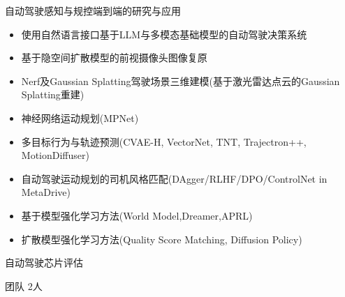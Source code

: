 \documentclass[../cv_cn.tex]{subfiles}
\begin{document}
\begin{cventries}
{\begin{cvitems}
			\item 自动驾驶感知与规控端到端的研究与应用
			\begin{itemize}
				\item 使用自然语言接口基于LLM与多模态基础模型的自动驾驶决策系统 \supercite{Xin_LLM_24} \supercite{Xin_VLM_24}
				\item 基于隐空间扩散模型的前视摄像头图像复原\supercite{Xin_Latent_Diffusion_23}
				\item Nerf及Gaussian Splatting驾驶场景三维建模(基于激光雷达点云的Gaussian Splatting重建)
				\item 神经网络运动规划(MPNet)
				\item 多目标行为与轨迹预测(CVAE-H, VectorNet, TNT, Trajectron++, MotionDiffuser)
				\item 自动驾驶运动规划的司机风格匹配(DAgger/RLHF/DPO/ControlNet in MetaDrive)
				\item 基于模型强化学习方法(World Model,Dreamer,APRL)
				\item 扩散模型强化学习方法(Quality Score Matching, Diffusion Policy)
			\end{itemize}
			\item 自动驾驶芯片评估
			\item 团队 2人
		\end{cvitems}
	}


\end{cventries}
\end{document}
